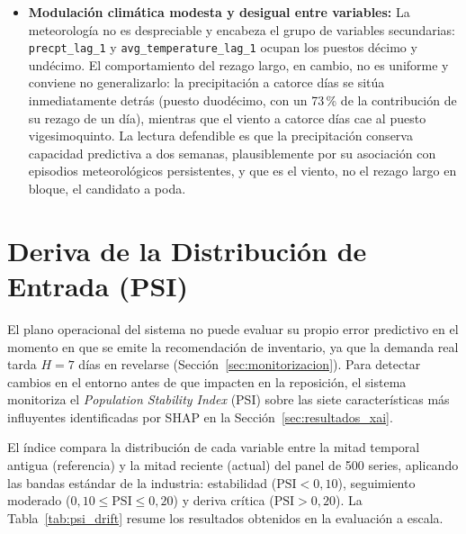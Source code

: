 \begin{itemize}
    \item \textbf{Modulación climática modesta y desigual entre variables:} La meteorología no es despreciable y encabeza el grupo de variables secundarias: \texttt{precpt\_lag\_1} y \texttt{avg\_}\allowbreak\texttt{temperature\_}\allowbreak\texttt{lag\_1} ocupan los puestos décimo y undécimo. El comportamiento del rezago largo, en cambio, no es uniforme y conviene no generalizarlo: la precipitación a catorce días se sitúa inmediatamente detrás (puesto duodécimo, con un 73\,\% de la contribución de su rezago de un día), mientras que el viento a catorce días cae al puesto vigesimoquinto. La lectura defendible es que la precipitación conserva capacidad predictiva a dos semanas, plausiblemente por su asociación con episodios meteorológicos persistentes, y que es el viento, no el rezago largo en bloque, el candidato a poda.
\end{itemize}


\section{Deriva de la Distribución de Entrada (PSI)}
\label{sec:resultados_drift}

El plano operacional del sistema no puede evaluar su propio error predictivo en el momento en que se emite la recomendación de inventario, ya que la demanda real tarda $H=7$ días en revelarse (Sección~\ref{sec:monitorizacion}). Para detectar cambios en el entorno antes de que impacten en la reposición, el sistema monitoriza el \textit{Population Stability Index} (PSI) sobre las siete características más influyentes identificadas por SHAP en la Sección~\ref{sec:resultados_xai}.

El índice compara la distribución de cada variable entre la mitad temporal antigua (referencia) y la mitad reciente (actual) del panel de 500 series, aplicando las bandas estándar de la industria: estabilidad ($\text{PSI} < 0{,}10$), seguimiento moderado ($0{,}10 \leq \text{PSI} \leq 0{,}20$) y deriva crítica ($\text{PSI} > 0{,}20$). La Tabla~\ref{tab:psi_drift} resume los resultados obtenidos en la evaluación a escala.

